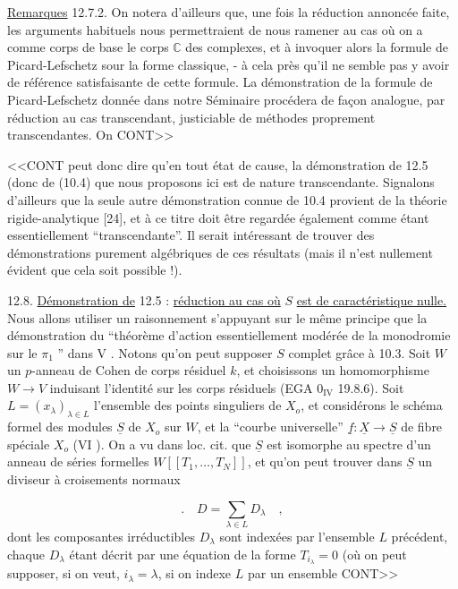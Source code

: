 \underline{Remarques} 12.7.2. On notera d'ailleurs que, une fois la réduction annoncée faite, les arguments habituels nous permettraient de nous ramener au cas où on a comme corps de base le corps $\mathbb{C}$ des complexes, et à invoquer alors la formule de Picard-Lefschetz sour la forme classique, - à cela près qu'il ne semble pas y avoir de référence satisfaisante de cette formule. La démonstration de la formule de Picard-Lefschetz donnée dans notre Séminaire procédera de façon analogue, par réduction au cas transcendant, justiciable de méthodes proprement transcendantes. On CONT>>



<<CONT peut donc dire qu'en tout état de cause, la démonstration de 12.5 (donc de (10.4) que nous proposons ici est de nature transcendante. Signalons d'ailleurs que la seule autre démonstration connue de 10.4 provient de la théorie rigide-analytique [24], et à ce titre doit être regardée également comme étant essentiellement ``transcendante''. Il serait intéressant de trouver des démonstrations purement algébriques de ces résultats (mais il n'est nullement évident que cela soit possible !).

12.8. \underline{Démonstration de} 12.5 : \underline{réduction au cas où} $S$ \underline{est de caractéristique nulle.} Nous allons utiliser un raisonnement s'appuyant sur le même principe que la démonstration du ``théorème d'action essentiellement modérée de la monodromie sur le $\pi_1$ '' dans V \hspace{4em}. Notons qu'on peut supposer $S$ complet grâce à 10.3. Soit $W$ un $p$-anneau de Cohen de corps résiduel $k$, et choisissons un homomorphisme $W \longrightarrow V$ induisant l'identité sur les corps résiduels (EGA $0_{\mathrm{IV}}$ 19.8.6). Soit $L = (x_\lambda)_{\lambda \in L}$ l'ensemble des points singuliers de $X_o$, et considérons le schéma formel des modules $\underline{S}$ de $X_o$ sur $W$, et la ``courbe universelle'' $\underline{f} : \underline{X} \longrightarrow \underline{S}$ de fibre spéciale $X_o$ (VI \hspace{3em}). On a vu dans loc. cit. que $\underline{S}$ est isomorphe au spectre d'un anneau de séries formelles $W[[T_1,\ldots,T_N]]$, et qu'on peut trouver dans $\underline{S}$ un diviseur à croisements normaux

\begin{equation}\tag{12.8.1}
. \quad D = \sum_{\lambda \in L} D_\lambda \quad ,
\end{equation}
dont les composantes irréductibles $D_\lambda$ sont indexées par l'ensemble $L$ précédent, chaque $D_\lambda$ étant décrit par une équation de la forme $T_{i_\lambda} = 0$ (où on peut supposer, si on veut, $i_\lambda = \lambda$, si on indexe $L$ par un ensemble CONT>>


